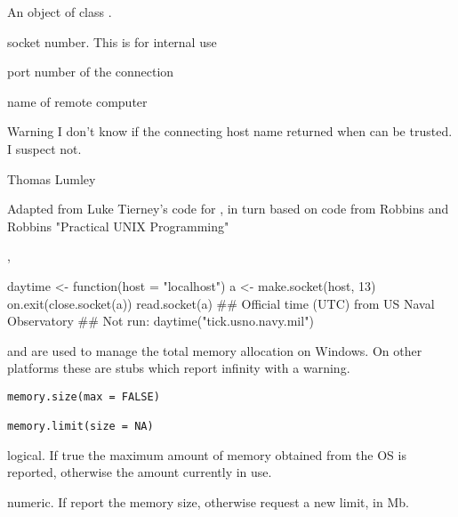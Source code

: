 %
\begin{Value}
An object of class .
\begin{ldescription}
\item[\code{socket}] socket number. This is for internal use
\item[\code{port}] port number of the connection
\item[\code{host}] name of remote computer
\end{ldescription}
\end{Value}
%
\begin{Section}{Warning}
I don't know if the connecting host name returned
when  can be trusted. I suspect not.
\end{Section}
%
\begin{Author}\relax
Thomas Lumley
\end{Author}
%
\begin{References}\relax
Adapted from Luke Tierney's code for , in turn
based on code from Robbins and Robbins "Practical UNIX Programming"
\end{References}
%
\begin{SeeAlso}\relax
{}, 
\end{SeeAlso}
%
\begin{Examples}
\begin{ExampleCode}
daytime <- function(host = "localhost"){
    a <- make.socket(host, 13)
    on.exit(close.socket(a))
    read.socket(a)
}
## Official time (UTC) from US Naval Observatory
## Not run: daytime("tick.usno.navy.mil")
\end{ExampleCode}
\end{Examples}
%
\begin{Description}\relax
{} and  are used to manage the
total memory allocation on Windows.  On other platforms these are
stubs which report infinity with a warning.
\end{Description}
%
\begin{Usage}
\begin{verbatim}
memory.size(max = FALSE)

memory.limit(size = NA)
\end{verbatim}
\end{Usage}
%
\begin{Arguments}
\begin{ldescription}
\item[\code{max}] logical. If true the maximum amount of memory obtained from
the OS is reported, otherwise the amount currently in use.
\item[\code{size}] numeric. If  report the memory size, otherwise
request a new limit, in Mb.
\end{ldescription}
\end{Arguments}
